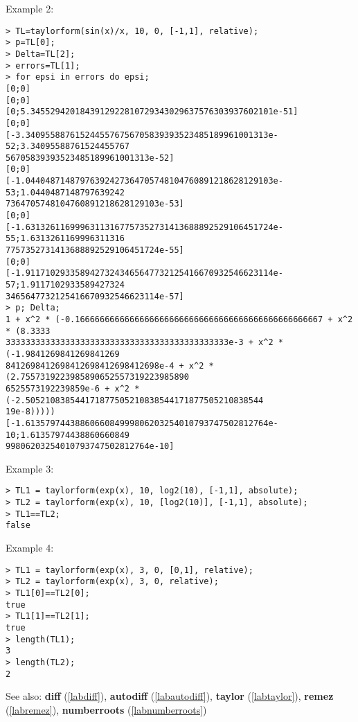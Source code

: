\noindent Example 2: 
\begin{center}\begin{minipage}{15cm}\begin{Verbatim}[frame=single]
> TL=taylorform(sin(x)/x, 10, 0, [-1,1], relative);
> p=TL[0];
> Delta=TL[2];
> errors=TL[1];
> for epsi in errors do epsi;
[0;0]
[0;0]
[0;5.3455294201843912922810729343029637576303937602101e-51]
[0;0]
[-3.3409558876152445576756705839393523485189961001313e-52;3.34095588761524455767
56705839393523485189961001313e-52]
[0;0]
[-1.04404871487976392427364705748104760891218628129103e-53;1.0440487148797639242
7364705748104760891218628129103e-53]
[0;0]
[-1.63132611699963113167757352731413688892529106451724e-55;1.6313261169996311316
7757352731413688892529106451724e-55]
[0;0]
[-1.91171029335894273243465647732125416670932546623114e-57;1.9117102933589427324
3465647732125416670932546623114e-57]
> p; Delta;
1 + x^2 * (-0.16666666666666666666666666666666666666666666666667 + x^2 * (8.3333
333333333333333333333333333333333333333333333e-3 + x^2 * (-1.9841269841269841269
8412698412698412698412698412698e-4 + x^2 * (2.7557319223985890652557319223985890
6525573192239859e-6 + x^2 * (-2.505210838544171877505210838544171877505210838544
19e-8)))))
[-1.6135797443886066084999806203254010793747502812764e-10;1.61357974438860660849
99806203254010793747502812764e-10]
\end{Verbatim}
\end{minipage}\end{center}
\noindent Example 3: 
\begin{center}\begin{minipage}{15cm}\begin{Verbatim}[frame=single]
> TL1 = taylorform(exp(x), 10, log2(10), [-1,1], absolute);
> TL2 = taylorform(exp(x), 10, [log2(10)], [-1,1], absolute);
> TL1==TL2;
false
\end{Verbatim}
\end{minipage}\end{center}
\noindent Example 4: 
\begin{center}\begin{minipage}{15cm}\begin{Verbatim}[frame=single]
> TL1 = taylorform(exp(x), 3, 0, [0,1], relative);
> TL2 = taylorform(exp(x), 3, 0, relative);
> TL1[0]==TL2[0];
true
> TL1[1]==TL2[1];
true
> length(TL1);
3
> length(TL2);
2
\end{Verbatim}
\end{minipage}\end{center}
See also: \textbf{diff} (\ref{labdiff}), \textbf{autodiff} (\ref{labautodiff}), \textbf{taylor} (\ref{labtaylor}), \textbf{remez} (\ref{labremez}), \textbf{numberroots} (\ref{labnumberroots})
